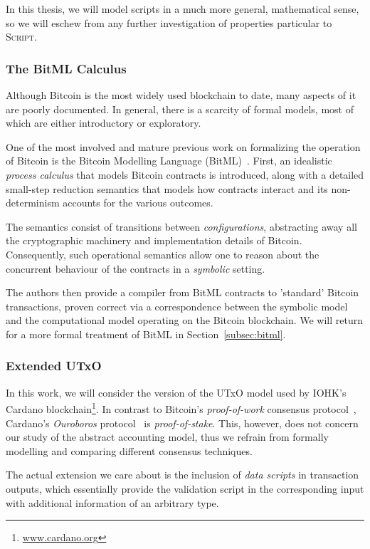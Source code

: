 \documentclass[acmsmall,nonacm=true,screen=true]{acmart}
\newcommand\site[1]{\footnote{\url{#1}}}
\begin{document}
In this thesis, we will model scripts in a much more general, mathematical sense, so
we will eschew from any further investigation of properties particular to \textsc{Script}.

\subsubsection{The BitML Calculus}
Although Bitcoin is the most widely used blockchain to date, many aspects of it are poorly documented.
In general, there is a scarcity of formal models, most of which are either introductory or exploratory.

One of the most involved and mature previous work on formalizing the operation of Bitcoin
is the Bitcoin Modelling Language (BitML)~\cite{bitml}. First, an idealistic \textit{process calculus}
that models Bitcoin contracts is introduced, along with a detailed small-step reduction semantics that
models how contracts interact and its non-determinism accounts for the various outcomes.

The semantics consist of transitions between \textit{configurations}, abstracting away all the
cryptographic machinery and implementation details of Bitcoin.
Consequently, such operational semantics allow one to reason about the concurrent behaviour of
the contracts in a \textit{symbolic} setting.

The authors then provide a compiler from BitML contracts to 'standard' Bitcoin transactions, proven
correct via a correspondence between the symbolic model and the computational model operating on
the Bitcoin blockchain. We will return for a more formal treatment of BitML in Section~\ref{subsec:bitml}.

\subsubsection{Extended UTxO}
In this work, we will consider the version of the UTxO model used by IOHK's Cardano blockchain\site{www.cardano.org}.
In contrast to Bitcoin's \textit{proof-of-work} consensus protocol~\cite{bitcoin}, 
Cardano's \textit{Ouroboros} protocol~\cite{ouroboros} is \textit{proof-of-stake}.
This, however, does not concern our study of the abstract accounting model, thus we
refrain from formally modelling and comparing different consensus techniques.

The actual extension we care about is the inclusion of \textit{data scripts} in transaction
outputs, which essentially provide the validation script in the corresponding input with additional
information of an arbitrary type.
\end{document}
